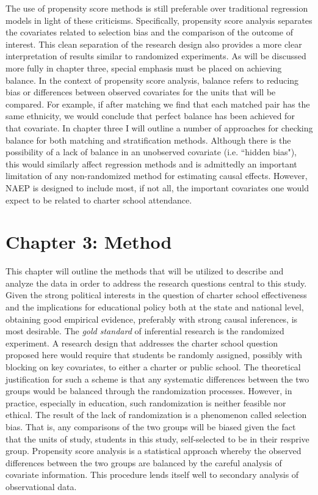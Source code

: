 \documentclass[letterpaper,12p,twoside]{article} %
\begin{document}
The use of propensity score methods is still preferable over traditional regression models in light of these criticisms. Specifically, propensity score analysis separates the covariates related to selection bias and the comparison of the outcome of interest. This clean separation of the research design also provides a more clear interpretation of results similar to randomized experiments. As will be discussed more fully in chapter three, special emphasis must be placed on achieving balance. In the context of propensity score analysis, balance refers to reducing bias or differences between observed covariates for the units that will be compared. For example, if after matching we find that each matched pair has the same ethnicity, we would conclude that perfect balance has been achieved for that covariate. In chapter three I will outline a number of approaches for checking balance for both matching and stratification methods. Although there is the possibility of a lack of balance in an unobserved covariate (i.e. ``hidden bias"), this would similarly affect regression methods and is admittedly an important limitation of any non-randomized method for estimating causal effects. However, NAEP is designed to include most, if not all, the important covariates one would expect to be related to charter school attendance.


\cleardoublepage
\section{Chapter 3: Method}
This chapter will outline the methods that will be utilized to describe and analyze the data in order to address the research questions central to this study. Given the strong political interests in the question of charter school effectiveness and the implications for educational policy both at the state and national level, obtaining good empirical evidence, preferably with strong causal inferences, is most desirable. The \textit{gold standard} of inferential research is the randomized experiment. A research design that addresses the charter school question proposed here would require that students be randomly assigned, possibly with blocking on key covariates, to either a charter or public school. The theoretical justification for such a scheme is that any systematic differences between the two groups would be balanced through the randomization processes. However, in practice, especially in education, such randomization is neither feasible nor ethical. The result of the lack of randomization is a phenomenon called selection bias. That is, any comparisons of the two groups will be biased given the fact that the units of study, students in this study, self-selected to be in their resprive group. Propensity score analysis \cite{RosenbaumRubin1983} is a statistical approach whereby the observed differences between the two groups are balanced by the careful analysis of covariate information. This procedure lends itself well to secondary analysis of observational data.
\end{document}
